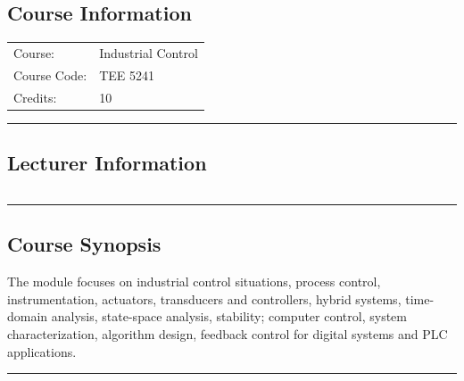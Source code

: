 
\subsection*{Course Information}\label{course:5241}
\vspace{0ex}%
\noindent\parbox{0.5\textwidth}{%
    \noindent\begin{tabular}{@{}ll}
                 \textsf{Course:}          & 	Industrial Control  \\
                 \textsf{Course Code:}         & 	TEE 5241    \\
                 \textsf{Credits:}    & 	10
    \end{tabular}}
\vspace{2ex}\hrule\vspace{2ex}

\subsection*{Lecturer Information}
\noindent\parbox{0.5\textwidth}{%
    \noindent\begin{tabular}{@{}ll}
                 
    \end{tabular}}
\vspace{2ex}\hrule\vspace{2ex}


\subsection*{Course Synopsis}
The module focuses on industrial control situations, process control, instrumentation, actuators, transducers and controllers, hybrid systems, time-domain analysis, state-space analysis, stability; computer control, system characterization, algorithm design, feedback control for digital systems and PLC applications.
\vspace{2ex} \hrule\vspace{2ex}


